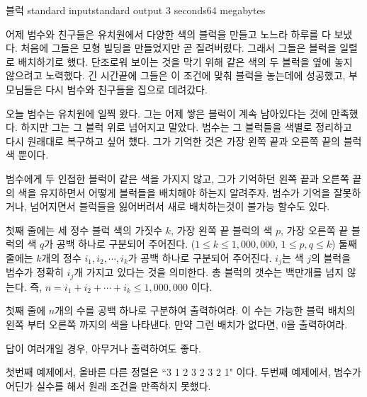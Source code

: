 \begin{problem}{블럭}
	{standard input}{standard output}
	{3 seconds}{64 megabytes}{}
	
	어제 범수와 친구들은 유치원에서 다양한 색의 블럭을 만들고 노느라 하루를 다 보냈다. 처음에 그들은 모형 빌딩을 만들었지만 곧 질려버렸다. 그래서 그들은 블럭을 일렬로 배치하기로 했다. 단조로워 보이는 것을 막기 위해 같은 색의 두 블럭을 옆에 놓지 않으려고 노력했다. 긴 시간끝에 그들은 이 조건에 맞춰 블럭을 놓는데에 성공했고, 부모님들은 다시 범수와 친구들을 집으로 데려갔다.
	 
	오늘 범수는 유치원에 일찍 왔다. 그는 어제 쌓은 블럭이 계속 남아있다는 것에 만족했다. 하지만 그는 그 블럭 위로 넘어지고 말았다. 범수는 그 블럭들을 색별로 정리하고 다시 원래대로 복구하고 싶어 했다. 그가 기억한 것은 가장 왼쪽 끝과 오른쪽 끝의 블럭 색 뿐이다.
	 
	범수에게 두 인접한 블럭이 같은 색을 가지지 않고, 그가 기억하던 왼쪽 끝과 오른쪽 끝의 색을 유지하면서 어떻게 블럭들을 배치해야 하는지 알려주자. 범수가 기억을 잘못하거나, 넘어지면서 블럭들을 잃어버려서 새로 배치하는것이 불가능 할수도 있다.
	
	
	
	\InputFile
	
	첫째 줄에는 세 정수 블럭 색의 가짓수 $k$, 가장 왼쪽 끝 블럭의 색 $p$, 가장 오른쪽 끝 블럭의 색 $q$가 공백 하나로 구분되어 주어진다. ($1 \le k \le 1,000,000$, $1 \le p, q \le k$)
	둘째 줄에는 $k$개의 정수 $i_1, i_2, \cdots, i_k$가 공백 하나로 구분되어 주어진다. $i_j$는 색 $j$의 블럭을 범수가 정확히 $i_j$개 가지고 있다는 것을 의미한다. 총 블럭의 갯수는 백만개를 넘지 않는다. 즉, $n=i_1 + i_2 + \cdots + i_k \le 1,000,000$ 이다.
	
	
	\OutputFile
	
	첫째 줄에 $n$개의 수를 공백 하나로 구분하여 출력하여라. 이 수는 가능한 블럭 배치의 왼쪽 부터 오른쪽 까지의 색을 나타낸다. 만약 그런 배치가 없다면, 0을 출력하여라.
	
	답이 여러개일 경우, 아무거나 출력하여도 좋다.
	
	\Examples
		
	\begin{example}
	\end{example}
	
	\Note
	
	첫번째 예제에서, 올바른 다른 정렬은 ``3 1 2 3 2 3 2 1" 이다. 두번째 예제에서, 범수가 어딘가 실수를 해서 원래 조건을 만족하지 못했다.
\end{problem}


